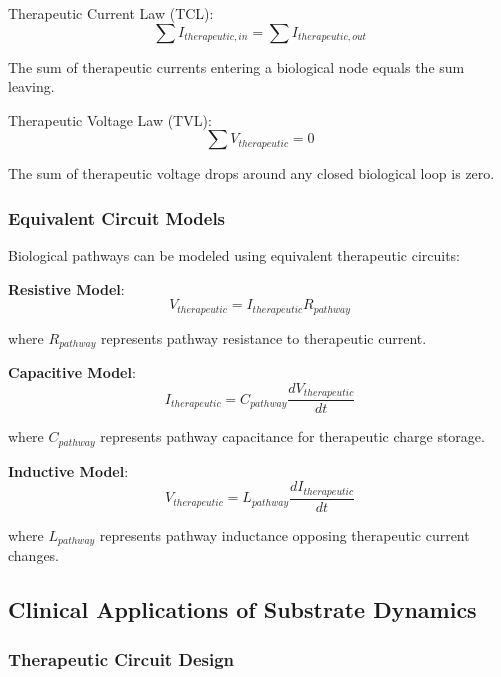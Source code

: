 \documentclass[12pt,a4paper]{article}
\begin{document}
Therapeutic Current Law (TCL):
\begin{equation}
\sum I_{therapeutic,in} = \sum I_{therapeutic,out}
\end{equation}

The sum of therapeutic currents entering a biological node equals the sum leaving.

Therapeutic Voltage Law (TVL):
\begin{equation}
\sum V_{therapeutic} = 0
\end{equation}

The sum of therapeutic voltage drops around any closed biological loop is zero.

\subsubsection{Equivalent Circuit Models}

Biological pathways can be modeled using equivalent therapeutic circuits:

\textbf{Resistive Model}:
\begin{equation}
V_{therapeutic} = I_{therapeutic} R_{pathway}
\end{equation}

where $R_{pathway}$ represents pathway resistance to therapeutic current.

\textbf{Capacitive Model}:
\begin{equation}
I_{therapeutic} = C_{pathway} \frac{dV_{therapeutic}}{dt}
\end{equation}

where $C_{pathway}$ represents pathway capacitance for therapeutic charge storage.

\textbf{Inductive Model}:
\begin{equation}
V_{therapeutic} = L_{pathway} \frac{dI_{therapeutic}}{dt}
\end{equation}

where $L_{pathway}$ represents pathway inductance opposing therapeutic current changes.

\subsection{Clinical Applications of Substrate Dynamics}

\subsubsection{Therapeutic Circuit Design}
\end{document}

